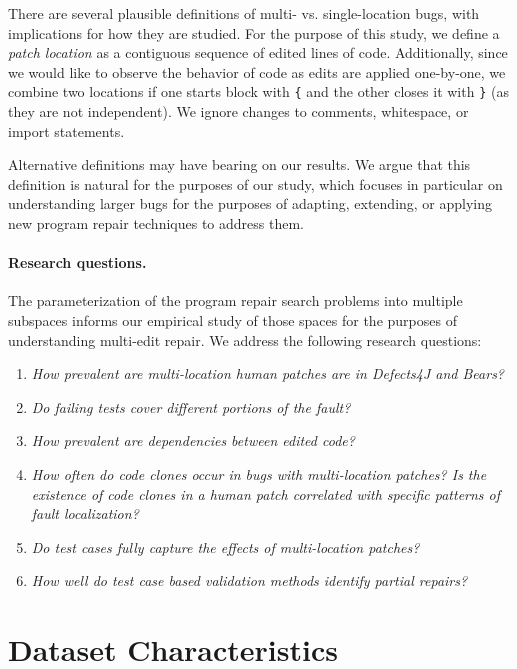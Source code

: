\documentclass[sigconf, timestamp-false, anonymous=true]{acmart}
\begin{document}
There are several plausible definitions of multi- vs. single-location bugs, with
implications for how they are studied. For the purpose of this study, we define
a \emph{patch location} as a contiguous sequence of edited lines of
code. Additionally, since we would like to observe the behavior of code as edits
are applied one-by-one, we combine two locations if one starts block with
\texttt{\{} and the other closes it with \texttt{\}} (as they are not
independent). We ignore changes to comments, whitespace, or import statements.

Alternative definitions may have bearing on our results.  We argue that this
definition is natural for the purposes of our study, which focuses in particular
on understanding larger bugs for the purposes of 
adapting, extending, or applying new program repair techniques to address them. 

\paragraph{Research questions.}  The parameterization of the program repair
search problems into multiple subspaces informs our empirical study of those
spaces for the purposes of understanding multi-edit repair.  We address the
following research questions:

\begin{enumerate}[label=RQ\arabic*:]
\item \emph{How prevalent are multi-location human patches are in Defects4J and Bears?}
\item \emph{Do failing tests cover different portions of the fault?}
\item \emph{How prevalent are dependencies between edited code?}
\item \emph{How often do code clones occur in bugs with multi-location
  patches? Is the existence of code clones in a human patch correlated with specific
  patterns of fault localization?}
\item \emph{Do test cases fully capture the effects of multi-location patches?}
\item \emph{How well do test case based validation methods identify partial repairs?}

\end{enumerate}

\section{Dataset Characteristics}
\label{sec:data-rq1}
\end{document}
